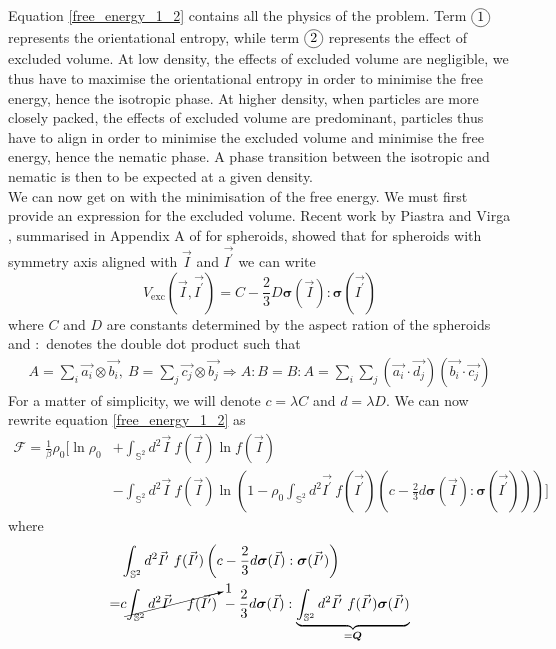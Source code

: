 \documentclass[class=article, float=false, crop=false]{standalone}
\begin{document}
Equation \ref{free_energy_1_2} contains all the physics of the problem. Term $\encircle{1}$ represents the orientational entropy, while term $\encircle{2}$ represents the effect of excluded volume. \cite{priestly2012introduction} At low density, the effects of excluded volume are negligible, we thus have to maximise the orientational entropy in order to minimise the free energy, hence the isotropic phase. At higher density, when particles are more closely packed, the effects of excluded volume are predominant, particles thus have to align in order to minimise the excluded volume and minimise the free energy, hence the nematic phase. A phase transition between the isotropic and nematic is then to be expected at a given density.\\

We can now get on with the minimisation of the free energy. We must first provide an expression for the excluded volume. Recent work by Piastra and Virga \cite{piastra2015explicit}, summarised in Appendix A of \cite{nascimento2017density} for spheroids, showed that for spheroids with symmetry axis aligned with $\vec{I}$ and $\vec{I^{\prime}}$ we can write
\begin{equation}
V_{\text{exc}}(\vec{I},\vec{I^{\prime}}) = C - \frac{2}{3}D\bm{\sigma}(\vec{I}):\bm{\sigma}(\vec{I^{\prime}})
\label{expression_excluded_volume}
\end{equation}
where $C$ and $D$ are constants determined by the aspect ration of the spheroids and $:$ denotes the double dot product such that
\begin{align*}
A = \sum_i \vec{a_i}\otimes\vec{b_i},~ B=\sum_j\vec{c_j}\otimes\vec{b_j} \Rightarrow A:B = B:A = \sum_i\sum_j (\vec{a_i}\cdot\vec{d_j})(\vec{b_i}\cdot\vec{c_j})
\end{align*}
For a matter of simplicity, we will denote $c=\lambda C$ and $d=\lambda D$. We can now rewrite equation \ref{free_energy_1_2} as
\begin{align*}
\mathcal{F} = \frac{1}{\beta} \rho_0 \Bigg[\ln\rho_0 &+ \int_{\mathbb{S}^2}d^2\vec{I}~ f(\vec{I})\ln f(\vec{I})\\
&- \int_{\mathbb{S}^2} d^2\vec{I}~f(\vec{I})\ln\left(1 - \rho_0\int_{\mathbb{S}^2}d^2\vec{I^{\prime}}~f(\vec{I^{\prime}})\left(c - \frac{2}{3}d\bm{\sigma}(\vec{I}):\bm{\sigma}(\vec{I^{\prime}})\right)\right)\Bigg]
\end{align*}
where
\begin{align*}
&\int_{\mathbb{S}^2}d^2\vec{I^{\prime}}~f(\vec{I^{\prime}})\left(c - \frac{2}{3}d\bm{\sigma}(\vec{I}):\bm{\sigma}(\vec{I^{\prime}})\right)\\
= &c\cancelto{1}{\int_{\mathbb{S}^2}d^2\vec{I^{\prime}}~~~ f(\vec{I^{\prime}})}~ - \frac{2}{3} d \bm{\sigma}(\vec{I}):\underbrace{\int_{\mathbb{S}^2}d^2\vec{I^{\prime}}~f(\vec{I^{\prime}})\bm{\sigma}(\vec{I^{\prime}})}_{=\bm{Q}}
\end{align*}
\end{document}
